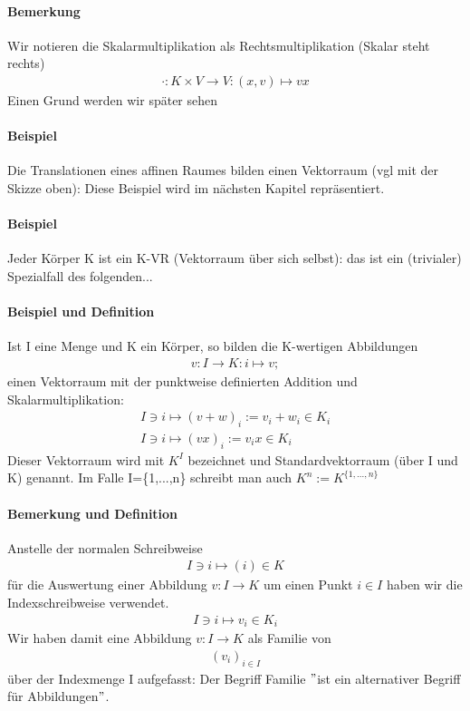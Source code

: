 \documentclass[12pt,a4paper,parskip=half-,DIV=15]{scrartcl}
\begin{document}
\paragraph{Bemerkung} Wir notieren die Skalarmultiplikation als Rechtsmultiplikation (Skalar steht rechts) 
\begin{align*}
\cdot: K \times V \to V : (x,v) \mapsto vx
\end{align*}
Einen Grund werden wir später sehen
\paragraph{Beispiel} Die Translationen eines affinen Raumes bilden einen Vektorraum (vgl mit der Skizze oben): Diese Beispiel wird im nächsten Kapitel repräsentiert.
\paragraph{Beispiel} Jeder Körper K ist ein K-VR (Vektorraum über sich selbst): das ist ein (trivialer) Spezialfall des folgenden...
\paragraph{Beispiel und Definition} Ist I eine Menge und K ein Körper, so bilden die K-wertigen Abbildungen
\begin{align*}
v: I \to K: i \mapsto v;
\end{align*}
einen Vektorraum mit der punktweise definierten Addition und Skalarmultiplikation:
\begin{align*}
I\ni i \mapsto (v+w)_i := v_i+w_i\in K_i\\
I\ni i \mapsto (vx)_i := v_ix \in K_i
\end{align*}
Dieser Vektorraum wird mit $K^{I}$ bezeichnet und Standardvektorraum (über I und K) genannt. Im Falle I=\{1,...,n\} schreibt man auch $K^{n} := K^{\{1,...,n\}}$
\paragraph{Bemerkung und Definition} Anstelle der normalen Schreibweise
\begin{align*}
I\ni i \mapsto (i) \in K
\end{align*}
für die Auswertung einer Abbildung  $v: I \to K$ um einen Punkt $i\in I$ haben wir die Indexschreibweise verwendet.
\begin{align*}
I\ni i \mapsto v_i \in K_i
\end{align*}
Wir haben damit eine Abbildung $v: I \to K$ als Familie von 
\begin{align*}
(v_i)_{i\in I}
\end{align*}
über der Indexmenge I aufgefasst: Der Begriff Familie $"$ist ein alternativer Begriff für Abbildungen$"$.
\end{document}
